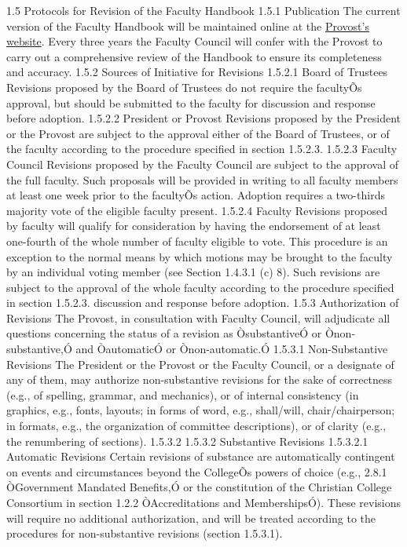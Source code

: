 \documentclass[letterpaper, 11pt]{article}
\begin{document}
			1.5 Protocols for Revision of the Faculty Handbook
			1.5.1 Publication
			The current version of the Faculty Handbook will be maintained online at the \href{http://www.westmont.edu/_offices/provost/documents/Faculty-Handbook.pdf}{Provost's website}.  Every three years the Faculty Council will confer with the Provost to carry out a comprehensive review of the Handbook to ensure its completeness and accuracy.
			1.5.2 Sources of Initiative for Revisions
			1.5.2.1 Board of Trustees
			Revisions proposed by the Board of Trustees do not require the facultyÕs approval, but should be submitted to the faculty for discussion and response before adoption.
			1.5.2.2 President or Provost
			Revisions proposed by the President or the Provost are subject to the approval either of the Board of Trustees, or of the faculty according to the procedure specified in section 1.5.2.3.
			1.5.2.3 Faculty Council
			Revisions proposed by the Faculty Council are subject to the approval of the full faculty. Such proposals will be provided in writing to all faculty members at least one week prior to the facultyÕs action. Adoption requires a two-thirds majority vote of the eligible faculty present.
			1.5.2.4 Faculty
			Revisions proposed by faculty will qualify for consideration by having the endorsement of at least one-fourth of the whole number of faculty eligible to vote. This procedure is an exception to the normal means by which motions may be brought to the faculty by an individual voting member (see Section 1.4.3.1 (c) 8).  Such revisions are subject to the approval of the whole faculty according to the procedure specified in section 1.5.2.3.
			discussion and response before adoption.
			1.5.3 Authorization of Revisions
			The Provost, in consultation with Faculty Council, will adjudicate all questions concerning the status of a revision as ÒsubstantiveÓ or Ònon-substantive,Ó and ÒautomaticÓ or Ònon-automatic.Ó
			1.5.3.1 Non-Substantive Revisions
			The President or the Provost or the Faculty Council, or a designate of any of them, may authorize non-substantive revisions for the sake of correctness (e.g., of spelling, grammar, and mechanics), or of internal consistency (in graphics, e.g., fonts, layouts; in forms of word, e.g., shall/will, chair/chairperson; in formats, e.g., the organization of committee descriptions), or of clarity (e.g., the renumbering of sections).
			1.5.3.2 1.5.3.2 Substantive Revisions
			1.5.3.2.1 Automatic Revisions
			Certain revisions of substance are automatically contingent on events and circumstances beyond the CollegeÕs powers of choice (e.g., 2.8.1 ÒGovernment Mandated Benefits,Ó or the constitution of the Christian College Consortium in section 1.2.2 ÒAccreditations and MembershipsÓ). These revisions will require no additional authorization, and will be treated according to the procedures for non-substantive revisions (section 1.5.3.1).
\end{document}
